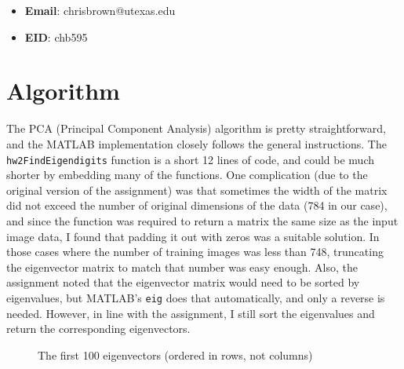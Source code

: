 \documentclass[11pt]{report}
\begin{document}
\begin{itemize}
  \item \textbf{Email}: chrisbrown@utexas.edu
  \item \textbf{EID}: chb595
\end{itemize}

\section{Algorithm}

The PCA (Principal Component Analysis) algorithm is pretty straightforward, and the MATLAB implementation closely follows the general instructions. The \texttt{hw2FindEigendigits} function is a short 12 lines of code, and could be much shorter by embedding many of the functions. One complication (due to the original version of the assignment) was that sometimes the width of the matrix did not exceed the number of original dimensions of the data (784 in our case), and since the function was required to return a matrix the same size as the input image data, I found that padding it out with zeros was a suitable solution. In those cases where the number of training images was less than 748, truncating the eigenvector matrix to match that number was easy enough. Also, the assignment noted that the eigenvector matrix would need to be sorted by eigenvalues, but MATLAB's \texttt{eig} does that automatically, and only a reverse is needed. However, in line with the assignment, I still sort the eigenvalues and return the corresponding eigenvectors.

\begin{figure}[h]
  \centering
  \caption{The first 100 eigenvectors (ordered in rows, not columns)}
  \label{fig:100eigenvectors}
\end{figure}
\end{document}
